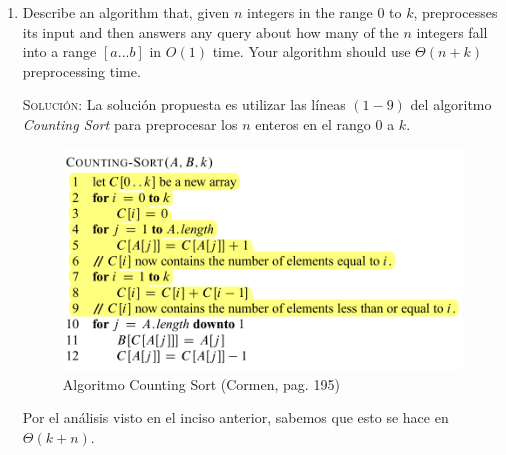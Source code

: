 \documentclass[letterpaper,11pt]{article}
\begin{document}
\begin{enumerate}
\begin{proof}
        Cuando $m$ es $O(n^2)$, también es posible ordenarlo en $O(n)$. Para 
        ello, utilizaremos una variación de \textit{Radix Sort}, el cual 
        también hemos discutido en clase. El siguiente paso forma parte del 
        algoritmo original: \textit{para cada elemento i lo que haremos es 
        ordenar el arreglo de entrada tomando en consideración el número de 
        menos significado del más pequeño al más grande}. Para usar este 
        algoritmo debe haber $d$ digitos en los enteros de entrada. Usualmente, 
        \textit{Radix Sort} toma $O(d \cdot (n + k))$, donde $k$ es la base 
        para representar números (por ejemplo, la base decimal). Como 
        $m = O(n^2)$, entonces ese es su mayor valor posible, por lo que 
        $d = O(\log_k n)$. Así, la complejidad sería $O(n + k) \cdot O(\log_k n)$.
        El truco aquí está en cambiar la base $k$. Si reemplazamos a $k$ con $n$
        entonces el valor de $O(\log_k n)$ se convierte en $O(1)$, y la 
        complejidad se convierte en $O(n)$.
    \end{proof}

    \item Describe an algorithm that, given $n$ integers in the range $0$ to 
    $k$, preprocesses its input and then answers any query about how many of 
    the $n$ integers fall into a range $[a ... b]$ in $O(1)$ time. Your 
    algorithm should use $\Theta(n + k)$ preprocessing time.

    \textsc{Solución:} La solución propuesta es utilizar las líneas $(1 - 9)$
    del algoritmo \textit{Counting Sort} para preprocesar los $n$ enteros en 
    el rango $0$ a $k$.

    \begin{figure}[h]
        \centering
        \includegraphics[width=0.5\linewidth]{imagenes/counting-sort.png}
        \caption{Algoritmo Counting Sort (Cormen, pag. 195)}
        \label{fig:counting-sort}
    \end{figure}

    Por el análisis visto en el inciso anterior, sabemos que esto se hace en 
    $\Theta(k + n)$. 


\end{enumerate}
\end{document}
